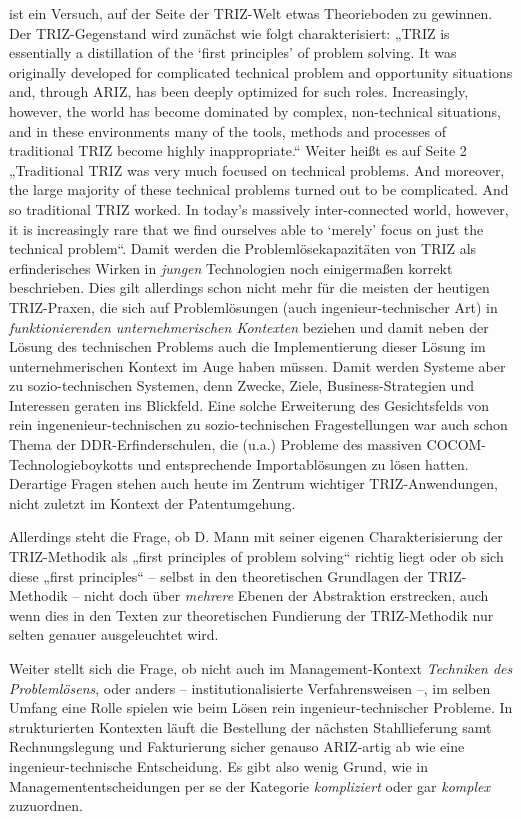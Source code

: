 \documentclass[11pt,a4paper]{article}
\begin{document}
\cite{Mann2019} ist ein Versuch, auf der Seite der TRIZ-Welt etwas
Theorieboden zu gewinnen. Der TRIZ-Gegenstand wird zunächst wie folgt
charakterisiert: „TRIZ is essentially a distillation of the `first principles'
of problem solving. It was originally developed for complicated technical
problem and opportunity situations and, through ARIZ, has been deeply
optimized for such roles. Increasingly, however, the world has become
dominated by complex, non-technical situations, and in these environments many
of the tools, methods and processes of traditional TRIZ become highly
inappropriate.“ Weiter heißt es auf Seite 2 „Traditional TRIZ was very much
focused on technical problems.  And moreover, the large majority of these
technical problems turned out to be complicated. And so traditional TRIZ
worked. In today's massively inter-connected world, however, it is
increasingly rare that we find ourselves able to `merely' focus on just the
technical problem“. Damit werden die Problemlösekapazitäten von TRIZ als
erfinderisches Wirken in \emph{jungen} Technologien noch einigermaßen korrekt
beschrieben. Dies gilt allerdings schon nicht mehr für die meisten der
heutigen TRIZ-Praxen, die sich auf Problemlösungen (auch ingenieur-technischer
Art) in \emph{funktionierenden unternehmerischen Kontexten} beziehen und damit
neben der Lösung des technischen Problems auch die Implementierung dieser
Lösung im unternehmerischen Kontext im Auge haben müssen.  Damit werden
Systeme aber zu sozio-technischen Systemen, denn Zwecke, Ziele,
Business-Strategien und Interessen geraten ins Blickfeld. Eine solche
Erweiterung des Gesichtsfelds von rein ingenenieur-technischen zu
sozio-technischen Fragestellungen war auch schon Thema der
DDR-Erfinderschulen, die (u.a.) Probleme des massiven
COCOM-Technologieboykotts und entsprechende Importablösungen zu lösen
hatten. Derartige Fragen stehen auch heute im Zentrum wichtiger
TRIZ-Anwendungen, nicht zuletzt im Kontext der Patentumgehung.

Allerdings steht die Frage, ob D. Mann mit seiner eigenen Charakterisierung
der TRIZ-Methodik als „first principles of problem solving“ richtig liegt oder
ob sich diese „first principles“ -- selbst in den theoretischen Grundlagen der
TRIZ-Methodik -- nicht doch über \emph{mehrere} Ebenen der Abstraktion
erstrecken, auch wenn dies in den Texten zur theoretischen Fundierung der
TRIZ-Methodik nur selten genauer ausgeleuchtet wird.

Weiter stellt sich die Frage, ob nicht auch im Management-Kontext
\emph{Techniken des Problemlösens}, oder anders -- institutionalisierte
Verfahrensweisen --, im selben Umfang eine Rolle spielen wie beim Lösen rein
ingenieur-technischer Probleme. In strukturierten Kontexten läuft die
Bestellung der nächsten Stahllieferung samt Rechnungslegung und Fakturierung
sicher genauso ARIZ-artig ab wie eine ingenieur-technische Entscheidung. Es
gibt also wenig Grund, wie in \cite{Mann2019} Managemententscheidungen per se
der Kategorie \emph{kompliziert} oder gar \emph{komplex} zuzuordnen.
\end{document}
